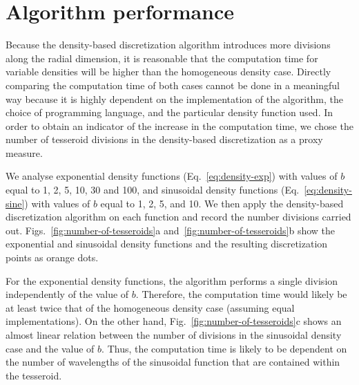\documentclass[extra, referee]{gji}
\begin{document}

\section{Algorithm performance}

Because the density-based discretization algorithm introduces more divisions along the
radial dimension, it is reasonable that the computation time for variable densities will
be higher than the homogeneous density case.
Directly comparing the computation time of both cases cannot be done in a meaningful
way because it is highly dependent on the implementation of the algorithm,
the choice of programming language, and the particular density function used.
In order to obtain an indicator of the increase in the computation time,
we chose the number of tesseroid divisions in the density-based discretization as a
proxy measure.

We analyse exponential density functions (Eq.~\ref{eq:density-exp}) with values of $b$
equal to 1, 2, 5, 10, 30 and 100, and sinusoidal density functions
(Eq.~\ref{eq:density-sine}) with values of $b$ equal to 1, 2, 5, and 10.
We then apply the density-based discretization algorithm on each function and record the
number divisions carried out.
Figs.~\ref{fig:number-of-tesseroids}a and~\ref{fig:number-of-tesseroids}b show the
exponential and sinusoidal density functions and the resulting discretization points as
orange dots.

For the exponential density functions, the algorithm performs a single division
independently of the value of $b$.
Therefore, the computation time would likely be at least twice that of the homogeneous
density case (assuming equal implementations).
On the other hand, Fig.~\ref{fig:number-of-tesseroids}c shows an almost linear relation
between the number of divisions in the sinusoidal density case and the value of $b$.
Thus, the computation time is likely to be dependent on the number of wavelengths
of the sinusoidal function that are contained within the tesseroid.
\end{document}
